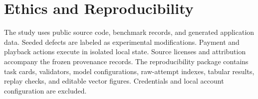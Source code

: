 \documentclass[11pt]{article}
\begin{document}
\section*{Ethics and Reproducibility}
The study uses public source code, benchmark records, and generated application data. Seeded defects are labeled as experimental modifications. Payment and playback actions execute in isolated local state. Source licenses and attribution accompany the frozen provenance records. The reproducibility package contains task cards, validators, model configurations, raw-attempt indexes, tabular results, replay checks, and editable vector figures. Credentials and local account configuration are excluded.



\clearpage
\appendix

\end{document}
